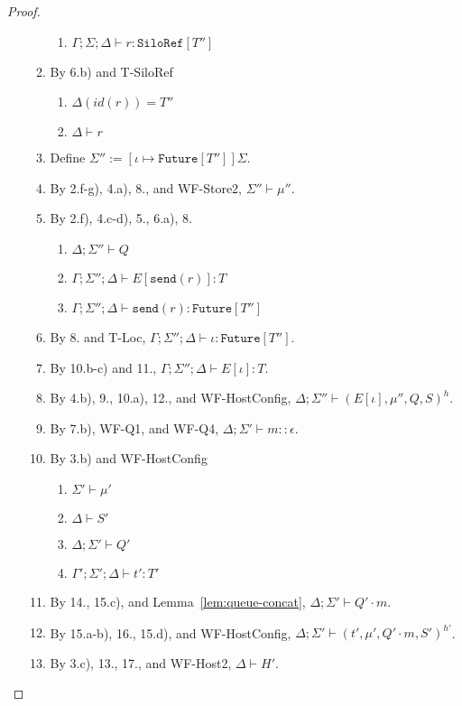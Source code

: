 \documentclass{article}
\theoremstyle{definition}
\begin{document}
\begin{proof}
\begin{itemize}
\begin{enumerate}
\begin{enumerate}[label=(\alph*)]
  \item $\Gamma ; \Sigma ; \Delta \vdash r : \texttt{SiloRef}[T'']$
  \end{enumerate}
\item By 6.b) and T-SiloRef
  \begin{enumerate}[label=(\alph*)]
  \item $\Delta(id(r)) = T''$
  \item $\Delta \vdash r$
  \end{enumerate}
\item Define $\Sigma'' := [\iota \mapsto \texttt{Future}[T'']]\Sigma$.
\item By 2.f-g), 4.a), 8., and WF-Store2, $\Sigma'' \vdash \mu''$.
\item By 2.f), 4.c-d), 5., 6.a), 8.
  \begin{enumerate}[label=(\alph*)]
  \item $\Delta ; \Sigma'' \vdash Q$
  \item $\Gamma ; \Sigma'' ; \Delta \vdash E[\texttt{send}(r)] : T$
  \item $\Gamma ; \Sigma'' ; \Delta \vdash \texttt{send}(r) : \texttt{Future}[T'']$
  \end{enumerate}
\item By 8. and T-Loc, $\Gamma ; \Sigma'' ; \Delta \vdash \iota : \texttt{Future}[T'']$.
\item By 10.b-c) and 11., $\Gamma ; \Sigma'' ; \Delta \vdash E[\iota] : T$.
\item By 4.b), 9., 10.a), 12., and WF-HostConfig, $\Delta ; \Sigma'' \vdash (E[\iota], \mu'', Q, S)^h$.
\item By 7.b), WF-Q1, and WF-Q4, $\Delta ; \Sigma' \vdash m :: \epsilon$.
\item By 3.b) and WF-HostConfig
  \begin{enumerate}[label=(\alph*)]
  \item $\Sigma' \vdash \mu'$
  \item $\Delta \vdash S'$
  \item $\Delta ; \Sigma' \vdash Q'$
  \item $\Gamma' ; \Sigma' ; \Delta \vdash t' : T'$
  \end{enumerate}
\item By 14., 15.c), and Lemma~\ref{lem:queue-concat}, $\Delta ; \Sigma' \vdash Q' \cdot m$.
\item By 15.a-b), 16., 15.d), and WF-HostConfig, $\Delta ; \Sigma' \vdash (t', \mu', Q' \cdot m, S')^{h'}$.
\item By 3.c), 13., 17., and WF-Host2, $\Delta \vdash H'$.
\end{enumerate}

\end{itemize}

\end{proof}
\end{document}
